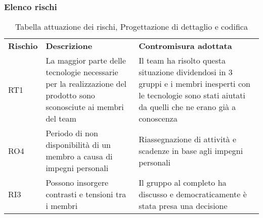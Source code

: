 \subsubsection{Elenco rischi}
\begin{table}[h]
	\caption{Tabella attuazione dei rischi, Progettazione di dettaglio e codifica}
	\begin{center}
		\begin{tabular}{p{2cm}p{6cm}p{6cm}}
			\textbf{Rischio} & \textbf{Descrizione}                                                                                                        & \textbf{Contromisura adottata}                                                                                                                                                   \\
			RT1              & La maggior parte delle tecnologie necessarie per la realizzazione del prodotto sono sconosciute ai membri del team & Il team ha risolto questa situazione dividendosi in 3 gruppi e i membri inesperti con le tecnologie sono stati aiutati da quelli che ne erano già a conoscenza
			\\
			RO4 & Periodo di non disponibilità di un membro a causa di impegni personali & Riassegnazione di attività e scadenze in base agli impegni personali
			\\
			RI3 & Possono insorgere contrasti e tensioni tra i membri & Il gruppo al completo ha discusso e democraticamente è stata presa una decisione
		\end{tabular}
	\end{center}
\end{table}